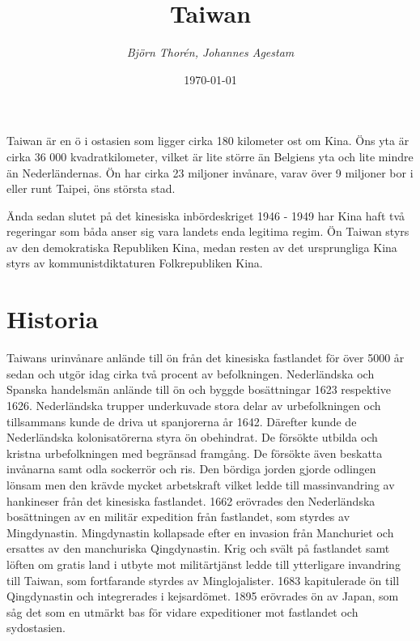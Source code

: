 \documentclass[a4paper,10pt]{article}
\title{\Huge\bf{Taiwan}\\}
\author{\emph{Björn Thorén, Johannes Agestam}}
\date{\today}
\begin{document}
\maketitle




Taiwan är en ö i ostasien som ligger cirka 180 kilometer ost om Kina. Öns yta är cirka 36 000 kvadratkilometer, vilket är lite större än Belgiens yta och lite mindre än Nederländernas. Ön har cirka 23 miljoner invånare, varav över 9 miljoner bor i eller runt Taipei, öns största stad. 

Ända sedan slutet på det kinesiska inbördeskriget 1946 - 1949 har Kina haft två regeringar som båda anser sig vara landets enda legitima regim. Ön Taiwan styrs av den demokratiska Republiken Kina, medan resten av det ursprungliga Kina styrs av kommunistdiktaturen Folkrepubliken Kina.



\section*{Historia}
Taiwans urinvånare anlände till ön från det kinesiska fastlandet för över 5000 år sedan och utgör idag cirka två procent av befolkningen. Nederländska och Spanska handelsmän anlände till ön och byggde bosättningar 1623 respektive 1626. Nederländska trupper underkuvade stora delar av urbefolkningen och tillsammans kunde de driva ut spanjorerna år 1642. Därefter kunde de Nederländska kolonisatörerna styra ön obehindrat. De försökte utbilda och kristna urbefolkningen med begränsad framgång. De försökte även beskatta invånarna samt odla sockerrör och ris. Den bördiga jorden gjorde odlingen lönsam men den krävde mycket arbetskraft vilket ledde till massinvandring av hankineser från det kinesiska fastlandet. 1662 erövrades den Nederländska bosättningen av en militär expedition från fastlandet, som styrdes av Mingdynastin. Mingdynastin kollapsade efter en invasion från Manchuriet och ersattes av den manchuriska Qingdynastin. Krig och svält på fastlandet samt löften om gratis land i utbyte mot militärtjänst ledde till ytterligare invandring till Taiwan, som fortfarande styrdes av Minglojalister. 1683 kapitulerade ön till Qingdynastin och integrerades i kejsardömet. 1895 erövrades ön av Japan, som såg det som en utmärkt bas för vidare expeditioner mot fastlandet och sydostasien.
\end{document}
